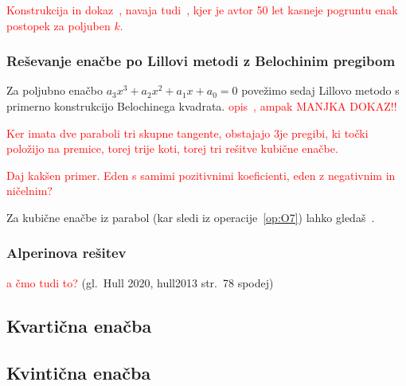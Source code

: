 \textcolor{red}{Konstrukcija in dokaz~\cite[str.\ 310]{hull2011}, navaja tudi~\cite[str.\ 156]{geometricconstructions}, kjer je avtor 50 let kasneje pogruntu enak postopek za poljuben $k$.}

\subsubsection{Reševanje enačbe po Lillovi metodi z Belochinim pregibom}

Za poljubno enačbo $a_3 x^3 + a_2 x^2 + a_1 x + a_0 = 0$ povežimo sedaj Lillovo metodo s primerno konstrukcijo Belochinega kvadrata. \textcolor{red}{opis~\cite[str.\ 312]{hull2011}, ampak MANJKA DOKAZ!!}

\textcolor{red}{Ker imata dve paraboli tri skupne tangente, obstajajo 3je pregibi, ki točki položijo na premice, torej trije koti, torej tri rešitve kubične enačbe.}

\textcolor{red}{Daj kakšen primer. Eden s samimi pozitivnimi koeficienti, eden z negativnim in ničelnim?}


Za kubične enačbe iz parabol (kar sledi iz operacije~\ref{op:O7}) lahko gledaš~\cite[str.\ 150]{geometricconstructions}.

\subsubsection{Alperinova rešitev}

\textcolor{red}{a čmo tudi to?} (gl.\ Hull 2020, hull2013 str.\ 78 spodej)

\subsection{Kvartična enačba}


\subsection{Kvintična enačba}